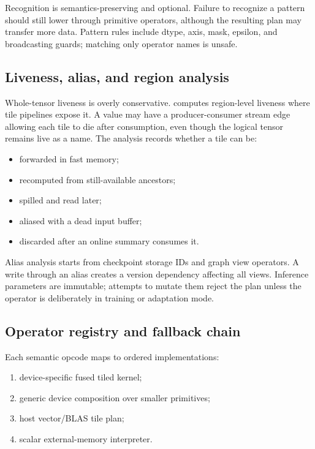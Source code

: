 Recognition is semantics-preserving and optional. Failure to recognize a pattern should still lower through primitive operators, although the resulting plan may transfer more data. Pattern rules include dtype, axis, mask, epsilon, and broadcasting guards; matching only operator names is unsafe.

\subsection{Liveness, alias, and region analysis}

Whole-tensor liveness is overly conservative. \AMS computes region-level liveness where tile pipelines expose it. A value may have a producer-consumer stream edge allowing each tile to die after consumption, even though the logical tensor remains live as a name. The analysis records whether a tile can be:

\begin{itemize}
  \item forwarded in fast memory;
  \item recomputed from still-available ancestors;
  \item spilled and read later;
  \item aliased with a dead input buffer;
  \item discarded after an online summary consumes it.
\end{itemize}

Alias analysis starts from checkpoint storage IDs and graph view operators. A write through an alias creates a version dependency affecting all views. Inference parameters are immutable; attempts to mutate them reject the plan unless the operator is deliberately in training or adaptation mode.

\subsection{Operator registry and fallback chain}

Each semantic opcode maps to ordered implementations:

\begin{enumerate}
  \item device-specific fused tiled kernel;
  \item generic device composition over smaller primitives;
  \item host vector/BLAS tile plan;
  \item scalar external-memory interpreter.
\end{enumerate}

